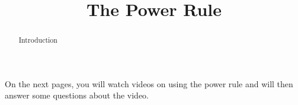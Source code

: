\documentclass[handout]{ximera}
\title{The Power Rule}
\begin{document}
\begin{abstract} Introduction %
\end{abstract}

\maketitle

On the next pages, you will watch videos on using the power rule and will then answer some questions about the video.
\end{document}
